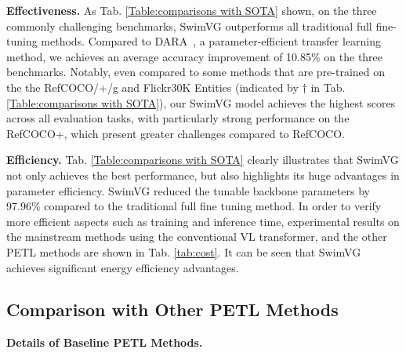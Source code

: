 \noindent
\textbf{Effectiveness.} As Tab. \ref{Table:comparisons with SOTA} shown, on the three commonly challenging benchmarks, SwimVG outperforms all traditional full fine-tuning methods. Compared to DARA~\cite{liu2024dara}, a parameter-efficient transfer learning method, we achieves an average accuracy improvement of 10.85\% on the three benchmarks. Notably, even compared to some methods that are pre-trained on the the RefCOCO/+/g and Flickr30K Entities (indicated by $\dagger$ in Tab. \ref{Table:comparisons with SOTA}), our SwimVG model achieves the highest scores across all evaluation tasks, with particularly strong performance on the RefCOCO+, which present greater challenges compared to RefCOCO.




\noindent
\textbf{Efficiency.} Tab. \ref{Table:comparisons with SOTA} clearly illustrates that SwimVG not only achieves the best performance, but also highlights its huge advantages in parameter efficiency. SwimVG reduced the tunable backbone parameters by 97.96\% compared to the traditional full fine tuning method. In order to verify more efficient aspects such as training and inference time, experimental results on the mainstream methods using the conventional VL transformer, and the other PETL methods are shown in Tab. \ref{tab:cost}. It can be seen that SwimVG achieves significant energy efficiency advantages.



\subsection{Comparison with Other PETL Methods}

\textbf{Details of Baseline PETL Methods.}

